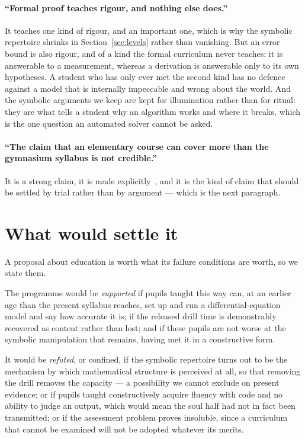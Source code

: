 \documentclass[11pt]{article}
\begin{document}
\paragraph{``Formal proof teaches rigour, and nothing else does.''} It teaches one kind of rigour,
and an important one, which is why the symbolic repertoire shrinks in Section~\ref{sec:levels}
rather than vanishing. But an error bound is also rigour, and of a kind the formal curriculum never
teaches: it is answerable to a measurement, whereas a derivation is answerable only to its own
hypotheses. A student who has only ever met the second kind has no defence against a model that is
internally impeccable and wrong about the world. And the symbolic arguments we keep are kept for
illumination rather than for ritual: they are what tells a student why an algorithm works and where
it breaks, which is the one question an automated solver cannot be asked.

\paragraph{``The claim that an elementary course can cover more than the gymnasium syllabus is not
credible.''} It is a strong claim, it is made explicitly~\cite{leibnizvs}, and it is the kind of
claim that should be settled by trial rather than by argument --- which is the next
paragraph.

\section{What would settle it}\label{sec:settle}

A proposal about education is worth what its failure conditions are worth, so we state them.

The programme would be \emph{supported} if pupils taught this way can, at an earlier age than the
present syllabus reaches, set up and run a differential-equation model and say how accurate it is;
if the released drill time is demonstrably recovered as content rather than lost; and if these
pupils are not worse at the symbolic manipulation that remains, having met it in a constructive
form.

It would be \emph{refuted}, or confined, if the symbolic repertoire turns out to be the mechanism by
which mathematical structure is perceived at all, so that removing the drill removes the capacity
--- a possibility we cannot exclude on present evidence; or if pupils taught constructively acquire
fluency with code and no ability to judge an output, which would mean the soul half had not in fact
been transmitted; or if the assessment problem proves insoluble, since a curriculum that cannot be
examined will not be adopted whatever its merits.
\end{document}
